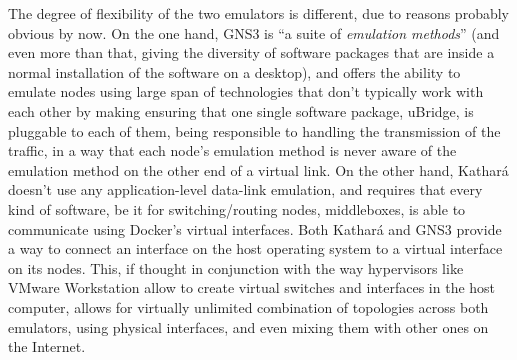 The degree of flexibility of the two emulators is different, due to reasons probably obvious by now.
On the one hand, GNS3 is ``a suite of \emph{emulation methods}'' (and even more than that, giving the diversity of software packages that are inside a normal installation of the software on a desktop), and offers the ability to emulate nodes using large span of technologies that don't typically work with each other by making ensuring that one single software package, uBridge, is pluggable to each of them, being responsible to handling the transmission of the traffic, in a way that each node's emulation method is never aware of the emulation method on the other end of a virtual link.
On the other hand, Kathará doesn't use any application-level data-link emulation, and requires that every kind of software, be it for switching/routing nodes, middleboxes, is able to communicate using Docker's virtual interfaces.
Both Kathará and GNS3 provide a way to connect an interface on the host operating system to a virtual interface on its nodes.
This, if thought in conjunction with the way hypervisors like VMware Workstation allow to create virtual switches and interfaces in the host computer, allows for virtually unlimited combination of topologies across both emulators, using physical interfaces, and even mixing them with other ones on the Internet.

